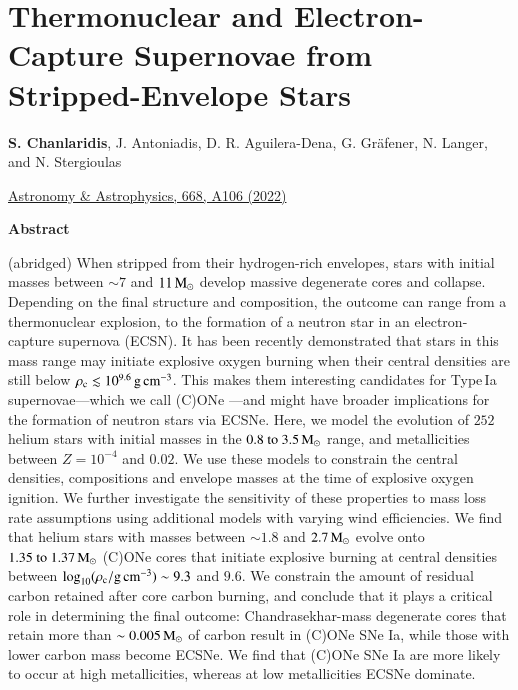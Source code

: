 \documentclass[main.tex]{subfiles}
\begin{document}
    \chapter[Thermonuclear and Electron-Capture Supernovae from Stripped-Envelope Stars]{Thermonuclear and Electron-Capture Supernovae from Stripped-Envelope Stars}
    \label{ch:tn_v_ec_sn}
    
    \begin{center}
        \textbf{S. Chanlaridis}, J. Antoniadis, D. R. Aguilera-Dena, G. Gr\"afener, N. Langer, and N. Stergioulas \\
        \begin{center}
            \href{https://www.aanda.org/articles/aa/full_html/2022/12/aa43035-22/aa43035-22.html}{Astronomy \& Astrophysics, 668, A106 (2022)}
        \end{center}
    \end{center}
        
        
    \begin{center}
        \textbf{\large Abstract}
    \end{center}

    (abridged) When stripped from their hydrogen-rich envelopes, stars with initial masses between $\sim 7$ and $11\mathrm{\,M_\odot}$ develop massive degenerate cores and collapse. Depending on the final structure and composition, the outcome can range from a thermonuclear explosion, to the formation of a neutron star in an electron-capture supernova (ECSN). It has been recently demonstrated that stars in this mass range may initiate explosive oxygen burning when their central densities are still below $\rho_{\mathrm{c}} \lesssim 10^{9.6}\mathrm{\,g\,cm^{-3}}$. This makes them interesting candidates for Type\,Ia supernovae---which we call (C)ONe \ias---and might have broader implications for the formation of neutron stars via ECSNe. Here, we model the evolution of $252$ helium stars with initial masses in the $\numrange{0.8}{3.5}\msun$ range, and metallicities between $Z=10^{-4}$ and $0.02$. We use these models to constrain the central densities, compositions and envelope masses at the time of explosive oxygen ignition. We further investigate the sensitivity of these properties to mass loss rate assumptions using additional models with varying wind efficiencies. We find that helium stars with masses between $\sim1.8$ and $2.7\mathrm{\,M_\odot}$ evolve onto $\numrange{1.35}{1.37}\msun$ (C)ONe cores that initiate explosive burning at central densities between $\log_{10} (\rho_{\mathrm{c}}/ \mathrm{g\,cm^{-3}}) \sim 9.3$ and $9.6$. We constrain the amount of residual carbon retained after core carbon burning, and conclude that it plays a critical role in determining the final outcome: Chandrasekhar-mass degenerate cores that retain more than $\sim 0.005\mathrm{\,M_\odot}$ of carbon result in (C)ONe SNe Ia, while those with lower carbon mass become ECSNe. We find that (C)ONe SNe Ia are more likely to occur at high metallicities, whereas at low metallicities ECSNe dominate.
\end{document}
